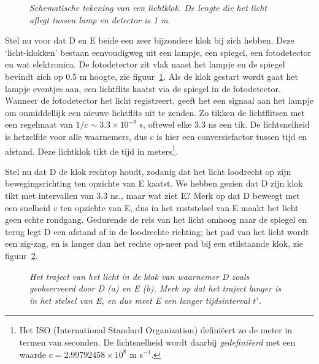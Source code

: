 \begin{figure}[ht]
\centering
\caption{{\sl Schematische tekening van een lichtklok. De lengte die het licht aflegt tussen lamp en detector is 1 m.}}
\label{f:lichtklok}
\end{figure}

Stel nu voor dat D en E beide een zeer bijzondere klok bij zich
hebben. Deze `licht-klokken' bestaan eenvoudigweg uit een lampje, een
spiegel, een fotodetector en wat elektronica. De fotodetector zit vlak
naast het lampje en de spiegel bevindt zich op 0.5 m hoogte, zie
figuur~\ref{f:lichtklok}. Als de klok gestart wordt gaat het lampje
eventjes aan, een lichtflits kaatst via de spiegel in de
fotodetector. Wanneer de fotodetector het licht registreert, geeft het
een signaal aan het lampje om onmiddellijk een nieuwe lichtflits uit te
zenden. Zo tikken de lichtflitsen met een regelmaat van $1/c \sim 3.3
\times 10^{-9}$ s, oftewel elke 3.3 ns een tik. De lichtsnelheid is
hetzelfde voor alle waarnemers, dus $c$ is hier een conversiefactor
tussen tijd en afstand. Deze lichtklok tikt de tijd in
meters\footnote{Het ISO (International Standard Organization)
defini\"eert zo de meter in termen van seconden. De lichtsnelheid
wordt daarbij {\it gedefini\"eerd} met een waarde $c=2.99792458 \times
10^8$ m s$^{-1}$.}.

Stel nu dat D de klok rechtop houdt, zodanig dat het licht loodrecht op zijn
bewegingsrichting ten opzichte van E kaatst. We hebben gezien dat D zijn klok tikt
met intervallen van 3.3 ns., maar wat ziet E? Merk op dat D beweegt
met een snelheid $v$ ten opzichte van E, dus in het ruststelsel van E
maakt het licht geen echte rondgang. Gedurende de reis van het licht
omhoog naar de spiegel en terug legt D een afstand af in de
loodrechte richting; het pad van het licht wordt een zig-zag, en is
langer dan het rechte op-neer pad bij een stilstaande klok, zie figuur~\ref{f:lichtklok2}.

\begin{figure}[ht]
\centering
\caption{{\sl Het traject van het licht in de klok van waarnemer D zoals
geobserveerd door D (a) en E (b). Merk op dat het traject langer is in
het stelsel van E, en dus meet E een langer tijdsinterval $t'$.}}
\label{f:lichtklok2}
\end{figure}

